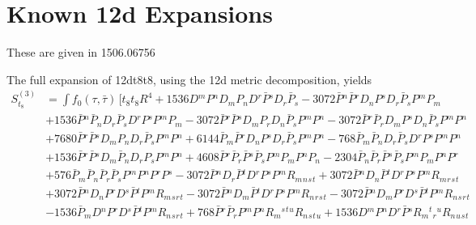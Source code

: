 \section{Known 12d Expansions}

These are given in 1506.06756

The full expansion of 12dt8t8, using the 12d metric decomposition, yields
\begin{align}
S^{(3)}_{t_8} &= \int f_0(\tau,\bar{\tau})\, \bigg [  t_8 t_8 R^4 
+ 1536 D{}^{m}P{}^{n} D{}_{m}P{}_{n} D{}^{r}\bar P{}^{s} D{}_{r}\bar P{}_{s} 
- 3072 \bar P{}^{n} \bar P{}^{r} D{}_{n}P{}^{s} D{}_{r}\bar P{}_{s} P{}^{m} P{}_{m} 
\nonumber \\ & 
+ 1536 \bar P{}^{n} \bar P{}_{n} D{}_{r}\bar P{}_{s} D{}^{r}P{}^{s} P{}^{m} P{}_{m} 
- 3072 \bar P{}^{r} \bar P{}^{s} D{}_{m}P{}_{r} D{}_{n}\bar P{}_{s} P{}^{m} P{}^{n} 
- 3072 \bar P{}^{r} \bar P{}_{r} D{}_{m}P{}^{s} D{}_{n}\bar P{}_{s} P{}^{m} P{}^{n} 
\nonumber \\ &
+ 7680 \bar P{}^{r} \bar P{}^{s} D{}_{m}P{}_{n} D{}_{r}\bar P{}_{s} P{}^{m} P{}^{n} 
+ 6144 \bar P{}_{m} \bar P{}^{r} D{}_{n}P{}^{s} D{}_{r}\bar P{}_{s} P{}^{m} P{}^{n}
 - 768 \bar P{}_{m} \bar P{}_{n} D{}_{r}\bar P{}_{s} D{}^{r}P{}^{s} P{}^{m} P{}^{n} 
\nonumber \\ &
+ 1536 \bar P{}^{r} \bar P{}^{s} D{}_{m}\bar P{}_{n} D{}_{r}P{}_{s} P{}^{m} P{}^{n} 
+ 4608 \bar P{}^{r} \bar P{}_{r} \bar P{}^{s} \bar P{}_{s} P{}^{m} P{}_{m} P{}^{n} P{}_{n} 
- 2304 \bar P{}_{n} \bar P{}_{r} \bar P{}^{s} \bar P{}_{s} P{}^{m} P{}_{m} P{}^{n} P{}^{r} 
\nonumber \\ &
+ 576 \bar P{}_{m} \bar P{}_{n} \bar P{}_{r} \bar P{}_{s} P{}^{m} P{}^{n} P{}^{r} P{}^{s} 
- 3072 \bar P{}^{n} D{}_{r}\bar P{}^{t} D{}^{r}P{}^{s} P{}^{m} R{}_{m}{}_{n}{}_{s}{}_{t} 
+ 3072 \bar P{}^{n} D{}_{n}\bar P{}^{t} D{}^{r}P{}^{s} P{}^{m} R{}_{m}{}_{r}{}_{s}{}_{t}
\nonumber \\ &
+ 3072 \bar P{}^{n} D{}_{n}P{}^{r} D{}^{s}\bar P{}^{t} P{}^{m} R{}_{m}{}_{s}{}_{r}{}_{t} 
- 3072 \bar P{}^{n} D{}_{m}\bar P{}^{t} D{}^{r}P{}^{s} P{}^{m} R{}_{n}{}_{r}{}_{s}{}_{t} 
- 3072 \bar P{}^{n} D{}_{m}P{}^{r} D{}^{s}\bar P{}^{t} P{}^{m} R{}_{n}{}_{s}{}_{r}{}_{t} 
\nonumber \\ &
- 1536 \bar P{}_{m} D{}^{n}P{}^{r} D{}^{s}\bar P{}^{t} P{}^{m} R{}_{n}{}_{s}{}_{r}{}_{t} 
+ 768 \bar P{}^{r} \bar P{}_{r} P{}^{m} P{}^{n} R{}_{m}{}^{s}{}^{t}{}^{u} R{}_{n}{}_{s}{}_{t}{}_{u} 
+ 1536 D{}^{m}P{}^{n} D{}^{r}\bar P{}^{s} R{}_{m}{}^{t}{}_{r}{}^{u} R{}_{n}{}_{u}{}_{s}{}_{t} 
\nonumber \\ &

\end{align}
